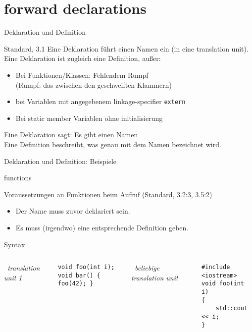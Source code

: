 \section{forward declarations}

\begin{frame}[fragile]{Deklaration und Definition}
	\begin{block}{Standard, 3.1}
		Eine Deklaration führt einen Namen ein (in eine translation unit).
		Eine Deklaration ist zugleich eine Definition, außer:
		\begin{itemize}
			\item Bei Funktionen/Klassen: Fehlendem Rumpf \\
				{\tiny (Rumpf: das zwischen den geschweiften Klammern) }
			\item bei Variablen mit angegebenem linkage-specifier \verb|extern|
			\item Bei static member Variablen ohne initialisierung
		\end{itemize}
	\end{block}
	
	\vspace{1em}
	
	\uncover<+->
	{
		Eine Deklaration sagt: Es gibt einen Namen \\
		Eine Definition beschreibt, was genau mit dem Namen bezeichnet wird.
	}
\end{frame}


\begin{frame}{Deklaration und Definition: Beispiele}
	\onslide*<+>
		
\end{frame}


\begin{frame}[fragile]{functions}
	\begin{block}{Voraussetzungen an Funktionen beim Aufruf (Standard, 3.2:3, 3.5:2)}
		\begin{itemize}
			\item Der Name muss zuvor deklariert sein.
			\item Es muss (irgendwo) eine entsprechende Definition geben.
		\end{itemize}
	\end{block}
	
	\begin{block}{Syntax}
		\begin{columns}[t]
				\emph{\ translation unit 1}
				\vspace{0.5em}
			\begin{lstlisting}
void foo(int i);
void bar() { foo(42); }
			\end{lstlisting}
			
				\emph{\ beliebige translation unit}
				\vspace{0.5em}
			\begin{lstlisting}
#include <iostream>
void foo(int i)
{
    std::cout << i;
}
			\end{lstlisting}
		\end{columns}
	\end{block}
\end{frame}


